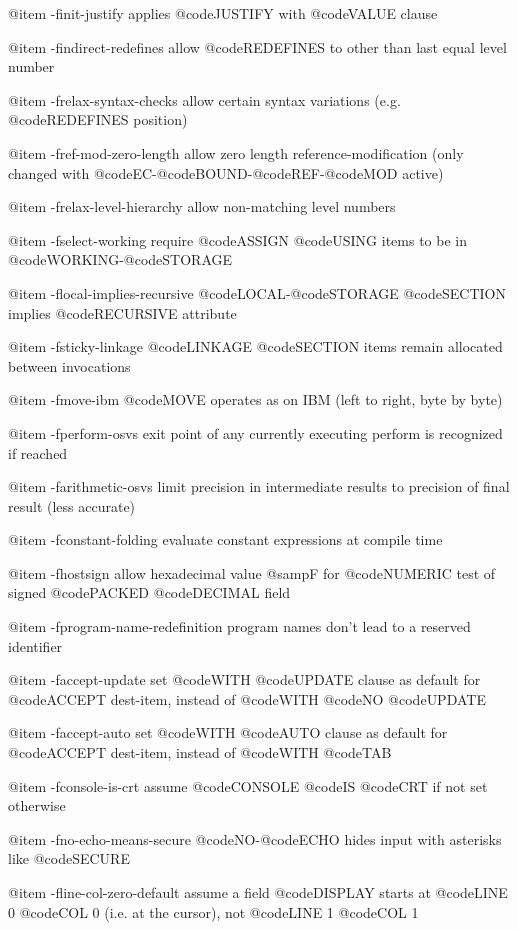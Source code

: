 @item -finit-justify
applies @code{JUSTIFY} with @code{VALUE} clause

@item -findirect-redefines
allow @code{REDEFINES} to other than last equal level number

@item -frelax-syntax-checks
allow certain syntax variations (e.g. @code{REDEFINES} position)

@item -fref-mod-zero-length
allow zero length reference-modification (only changed with @code{EC}-@code{BOUND}-@code{REF}-@code{MOD} active)

@item -frelax-level-hierarchy
allow non-matching level numbers

@item -fselect-working
require @code{ASSIGN} @code{USING} items to be in @code{WORKING}-@code{STORAGE}

@item -flocal-implies-recursive
@code{LOCAL}-@code{STORAGE} @code{SECTION} implies @code{RECURSIVE} attribute

@item -fsticky-linkage
@code{LINKAGE} @code{SECTION} items remain allocated between invocations

@item -fmove-ibm
@code{MOVE} operates as on IBM (left to right, byte by byte)

@item -fperform-osvs
exit point of any currently executing perform is recognized if reached

@item -farithmetic-osvs
limit precision in intermediate results to precision of final result (less accurate)

@item -fconstant-folding
evaluate constant expressions at compile time

@item -fhostsign
allow hexadecimal value @samp{F} for @code{NUMERIC} test of signed @code{PACKED} @code{DECIMAL} field

@item -fprogram-name-redefinition
program names don't lead to a reserved identifier

@item -faccept-update
set @code{WITH} @code{UPDATE} clause as default for @code{ACCEPT} dest-item, instead of @code{WITH} @code{NO} @code{UPDATE}

@item -faccept-auto
set @code{WITH} @code{AUTO} clause as default for @code{ACCEPT} dest-item, instead of @code{WITH} @code{TAB}

@item -fconsole-is-crt
assume @code{CONSOLE} @code{IS} @code{CRT} if not set otherwise

@item -fno-echo-means-secure
@code{NO}-@code{ECHO} hides input with asterisks like @code{SECURE}

@item -fline-col-zero-default
assume a field @code{DISPLAY} starts at @code{LINE 0} @code{COL 0} (i.e. at the cursor), not @code{LINE 1} @code{COL 1}

